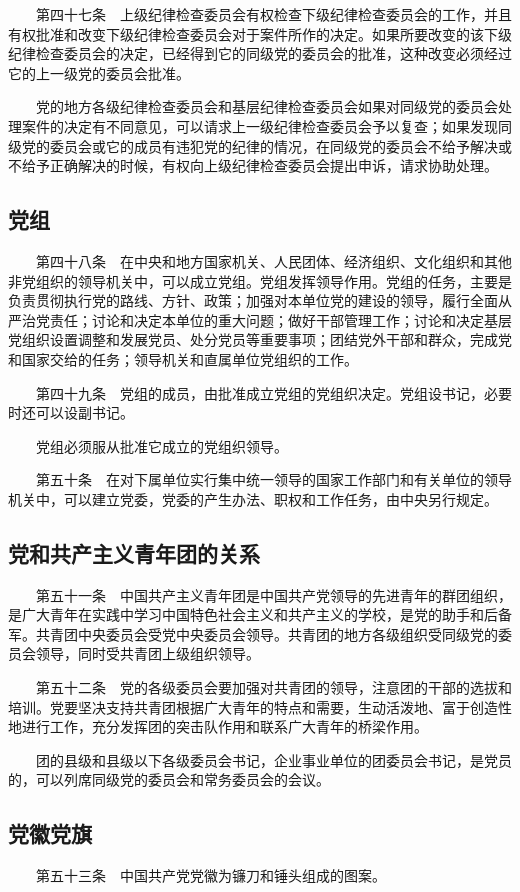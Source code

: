 　　第四十七条　上级纪律检查委员会有权检查下级纪律检查委员会的工作，并且有权批准和改变下级纪律检查委员会对于案件所作的决定。如果所要改变的该下级纪律检查委员会的决定，已经得到它的同级党的委员会的批准，这种改变必须经过它的上一级党的委员会批准。

　　党的地方各级纪律检查委员会和基层纪律检查委员会如果对同级党的委员会处理案件的决定有不同意见，可以请求上一级纪律检查委员会予以复查；如果发现同级党的委员会或它的成员有违犯党的纪律的情况，在同级党的委员会不给予解决或不给予正确解决的时候，有权向上级纪律检查委员会提出申诉，请求协助处理。

    \subsection{党组}
　　第四十八条　在中央和地方国家机关、人民团体、经济组织、文化组织和其他非党组织的领导机关中，可以成立党组。党组发挥领导作用。党组的任务，主要是负责贯彻执行党的路线、方针、政策；加强对本单位党的建设的领导，履行全面从严治党责任；讨论和决定本单位的重大问题；做好干部管理工作；讨论和决定基层党组织设置调整和发展党员、处分党员等重要事项；团结党外干部和群众，完成党和国家交给的任务；领导机关和直属单位党组织的工作。

　　第四十九条　党组的成员，由批准成立党组的党组织决定。党组设书记，必要时还可以设副书记。

　　党组必须服从批准它成立的党组织领导。

　　第五十条　在对下属单位实行集中统一领导的国家工作部门和有关单位的领导机关中，可以建立党委，党委的产生办法、职权和工作任务，由中央另行规定。

    \subsection{党和共产主义青年团的关系}
　　第五十一条　中国共产主义青年团是中国共产党领导的先进青年的群团组织，是广大青年在实践中学习中国特色社会主义和共产主义的学校，是党的助手和后备军。共青团中央委员会受党中央委员会领导。共青团的地方各级组织受同级党的委员会领导，同时受共青团上级组织领导。

　　第五十二条　党的各级委员会要加强对共青团的领导，注意团的干部的选拔和培训。党要坚决支持共青团根据广大青年的特点和需要，生动活泼地、富于创造性地进行工作，充分发挥团的突击队作用和联系广大青年的桥梁作用。

　　团的县级和县级以下各级委员会书记，企业事业单位的团委员会书记，是党员的，可以列席同级党的委员会和常务委员会的会议。

    \subsection{党徽党旗}
　　第五十三条　中国共产党党徽为镰刀和锤头组成的图案。


